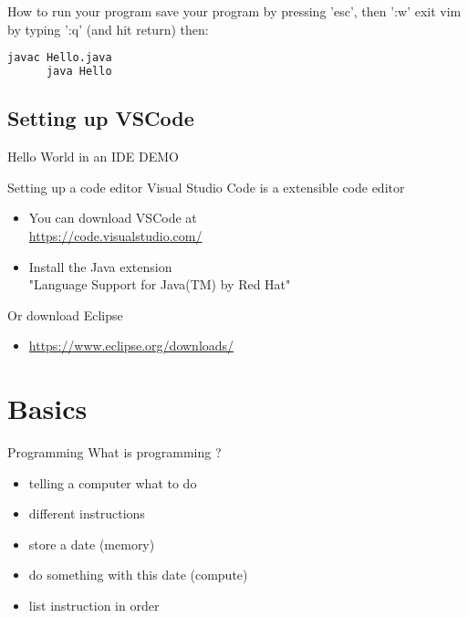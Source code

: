 \begin{frame}[fragile]{How to run your program}
   save your program by pressing 'esc', then ':w'
   exit vim by typing ':q' (and hit return)
   then:
   \begin{lstlisting}[language=bash]
      javac Hello.java
      java Hello
   \end{lstlisting}
\end{frame}

\subsection{Setting up VSCode}

\begin{frame}{Hello World in an IDE}
   DEMO
\end{frame}

\begin{frame}{Setting up a code editor}
  Visual Studio Code is a extensible code editor
  \begin{itemize}
      \item You can download VSCode at  \\
          \url{https://code.visualstudio.com/}
      \item Install the Java extension \\
       "Language Support for Java(TM) by Red Hat"
  \end{itemize}
  Or download Eclipse
  \begin{itemize}
  	\item \url{https://www.eclipse.org/downloads/}
  \end{itemize}
\end{frame}

\section{Basics}

\begin{frame}{Programming}
	What is programming ?
	\begin{itemize}
		\item<1-> telling a computer what to do
		\item<2-> different instructions
		\item<3-> store a date (memory)
		\item<4-> do something with this date (compute)
		\item<5-> list instruction in order
	\end{itemize}
\end{frame}

